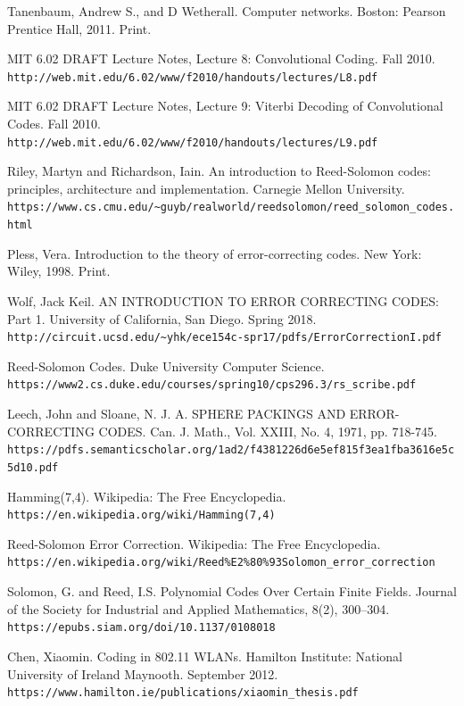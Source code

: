 \documentclass[12pt]{article}
\begin{document}
\begin{thebibliography}{9}

Tanenbaum, Andrew S., and D Wetherall. Computer networks. Boston: Pearson Prentice Hall, 2011. Print.
 
MIT 6.02 DRAFT Lecture Notes, Lecture 8: Convolutional Coding. Fall 2010. 
\\\texttt{http://web.mit.edu/6.02/www/f2010/handouts/lectures/L8.pdf}

MIT 6.02 DRAFT Lecture Notes, Lecture 9: Viterbi Decoding of Convolutional Codes. Fall 2010.
\\\texttt{http://web.mit.edu/6.02/www/f2010/handouts/lectures/L9.pdf}

Riley, Martyn and Richardson, Iain. An introduction to Reed-Solomon codes: principles, architecture and implementation. Carnegie Mellon University.
\\\texttt{https://www.cs.cmu.edu/\textasciitilde{}guyb/realworld/reedsolomon/reed\_solomon\_codes.html}

Pless, Vera. Introduction to the theory of error-correcting codes. New York: Wiley, 1998. Print.

Wolf, Jack Keil. AN INTRODUCTION TO ERROR CORRECTING CODES: Part 1. University of California, San Diego. Spring 2018. \texttt{http://circuit.ucsd.edu/\textasciitilde{}yhk/ece154c-spr17/pdfs/ErrorCorrectionI.pdf}

Reed-Solomon Codes. Duke University Computer Science. \texttt{https://www2.cs.duke.edu/courses/spring10/cps296.3/rs\_scribe.pdf
}

Leech, John and Sloane, N. J. A. SPHERE PACKINGS AND ERROR-CORRECTING CODES. Can. J. Math., Vol. XXIII, No. 4, 1971, pp. 718-745. \texttt{https://pdfs.semanticscholar.org/1ad2/f4381226d6e5ef815f3ea1fba3616e5c5d10.pdf}

Hamming(7,4). Wikipedia: The Free Encyclopedia. \texttt{https://en.wikipedia.org/wiki/Hamming(7,4)}

Reed-Solomon Error Correction. Wikipedia: The Free Encyclopedia. \texttt{https://en.wikipedia.org/wiki/Reed\%E2\%80\%93Solomon\_error\_correction
}

Solomon, G. and Reed, I.S. Polynomial Codes Over Certain Finite Fields. Journal of the Society for Industrial and Applied Mathematics, 8(2), 300–304. \texttt{https://epubs.siam.org/doi/10.1137/0108018}

Chen, Xiaomin. Coding in 802.11 WLANs. Hamilton Institute: National University of Ireland Maynooth. September 2012. \texttt{https://www.hamilton.ie/publications/xiaomin\_thesis.pdf
}

\end{thebibliography}
\end{document}
